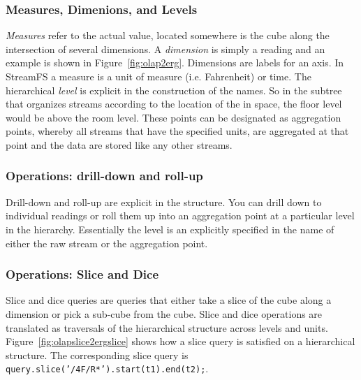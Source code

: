 \subsubsection{Measures, Dimenions, and Levels}
\emph{Measures} refer to the actual value, located somewhere is the cube along the intersection of several dimensions.
A \emph{dimension} is simply a reading and an example is shown in Figure~\ref{fig:olap2erg}.  Dimensions 
are labels for an axis.  In StreamFS a measure is a unit of measure (i.e. Fahrenheit) or time.  The hierarchical \emph{level}
is explicit in the construction of the names.  So in the subtree that organizes streams according to the location of the
in space, the floor level would be above the room level.  These points can be designated as aggregation points, whereby
all streams that have the specified units, are aggregated at that point and the data are stored like any other streams.

\subsubsection{Operations: drill-down and roll-up}
Drill-down and roll-up are explicit in the structure.  You can drill down to individual readings or roll them
up into an aggregation point at a particular level in the hierarchy.  Essentially the level is an explicitly specified in the 
name of either the raw stream or the aggregation point.

\subsubsection{Operations: Slice and Dice}
Slice and dice queries are queries that either take a slice of the cube along a dimension or pick a sub-cube from the cube.
Slice and dice operations are translated as traversals of the hierarchical structure across levels and units.  Figure~\ref{fig:olapslice2ergslice}
shows how a slice query is satisfied on a hierarchical structure.  The corresponding slice query 
is \\ \texttt{query.slice('/4F/R*').start(t1).end(t2);}.

